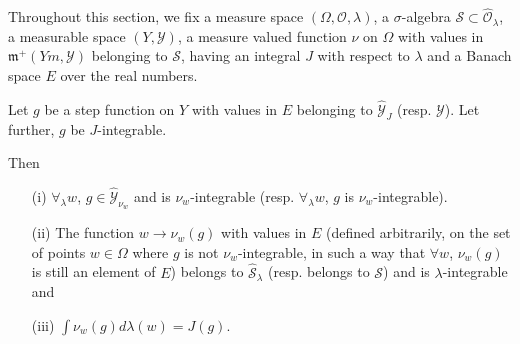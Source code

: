 Throughout this section, we fix a measure space $(\Omega, \mathscr{O},
\lambda)$, a $\sigma$-algebra $\mathcal{S} \subset
\hat{\mathscr{O}}_\lambda$, a measurable space $(Y, \mathscr{Y})$, a
measure valued function $\nu$ on $\Omega$ with values in
$\mathfrak{m}^+ (Ym,  \mathscr{Y})$ belonging to $\mathcal{S}$, having
an integral $J$ with respect to $\lambda$ and a Banach space $E$ over
the real numbers. 

\begin{proposition}\label{part1:chap2:prop18}
Let $g$ be a step function on $Y$ with values in $E$ belonging to
$\hat{\mathscr{Y}}_J$ (resp. $\mathscr{Y}$). Let further, $g$ be
$J$-integrable. 

Then 
\begin{itemize}
\item[{\rm (i)}] $\forall_\lambda w$, $g \in \hat{\mathscr{Y}}_{\nu_w}
  $ and is $\nu_w$-integrable (resp. $\forall_\lambda w$, $g$ is
  $\nu_w$-integrable). 

\item[{\rm (ii)}] The function $w \to\nu_w(g)$ with values in $E$
  (defined arbitrarily, on the set of points $w \in \Omega$ where $g$
  is not $\nu_w$-integrable, in such a way that $\forall w$, $\nu_w
  (g)$ is still an element of $E$) belongs to
  $\hat{\mathcal{S}}_\lambda$ (resp. belongs to $\mathcal{S}$) and is
  $\lambda$-integrable and 

\item[{\rm (iii)}] \qquad $\int \nu_w (g) d \lambda(w) = J(g)$. 
\end{itemize}
\end{proposition}


